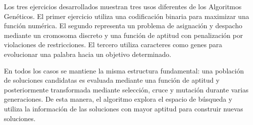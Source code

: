 \documentclass[14pt,twoside]{article}
\begin{document}
Los tres ejercicios desarrollados muestran tres usos diferentes de los Algoritmos
Genéticos. El primer ejercicio utiliza una codificación binaria para maximizar una
función numérica. El segundo representa un problema de asignación y despacho mediante
un cromosoma discreto y una función de aptitud con penalización por violaciones de
restricciones. El tercero utiliza caracteres como genes para evolucionar una palabra
hacia un objetivo determinado.

En todos los casos se mantiene la misma estructura fundamental: una población de
soluciones candidatas es evaluada mediante una función de aptitud y posteriormente
transformada mediante selección, cruce y mutación durante varias generaciones. De
esta manera, el algoritmo explora el espacio de búsqueda y utiliza la información de
las soluciones con mayor aptitud para construir nuevas soluciones.
\end{document}

